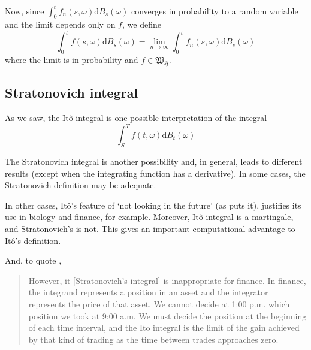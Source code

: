 \documentclass[12pt,a4paper]{article}
\theoremstyle{definition}
\newtheorem{theorem}{Theorem}[section]
\begin{document}
Now, since $\int_0^t f_n(s, \omega) \mathrm{d}B_s(\omega)$ converges in probability to a random variable and the limit depends only on $f$, we define
\[
	\int_0^t f(s, \omega) \mathrm{d}B_s(\omega) = \lim_{n \to \infty} \int_0^t f_n(s, \omega) \mathrm{d}B_s(\omega)
\]
where the limit is in probability and $f \in \mathfrak{W}_{\mathfrak{H}}$.

\subsection{Stratonovich integral}

As we saw, the Itô integral is one possible interpretation of the integral 
\[
	\int_S^T f(t, \omega) \mathrm{d}B_t(\omega)
\]

The Stratonovich integral is another possibility and, in general, leads to different results (except when the integrating function has a derivative). In some cases, the Stratonovich definition may be adequate.

In other cases, Itô's feature of `not looking in the future' (as \cite{oksendal2013stochastic} puts it), justifies its use in biology and finance, for example. Moreover, Itô integral is a martingale, and Stratonovich's is not. This gives an important computational advantage to Itô's definition. 

And, to quote \cite{shreve2004stochastic},

\begin{quotation}
	However, it [Stratonovich's integral] is inappropriate for finance. In finance, the integrand represents a position in an asset and the integrator represents the price of that asset. We cannot decide at 1:00 p.m. which position we took at 9:00 a.m. We must decide the position at the beginning of each time interval, and the Ito integral is the limit of the gain achieved by that kind of trading as the time between trades approaches zero.
\end{quotation}


%
\end{document}
